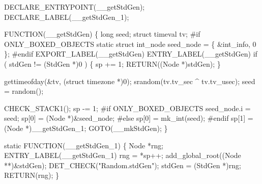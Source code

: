 DECLARE_ENTRYPOINT(__getStdGen);
DECLARE_LABEL(__getStdGen_1);

FUNCTION(__getStdGen)
\{
    long           seed;
    struct timeval tv;
#if ONLY_BOXED_OBJECTS
    static struct int_node seed_node = \{ &int_info, 0 \};
#endif
    EXPORT_LABEL(__getStdGen)
 ENTRY_LABEL(__getStdGen)
    if ( stdGen != (StdGen *)0 )
    \{
        sp += 1;
        RETURN((Node *)stdGen);
    \}

    gettimeofday(&tv, (struct timezone *)0);
    srandom(tv.tv_sec ^ tv.tv_usec);
    seed = random();

    CHECK_STACK1();
    sp -= 1;
#if ONLY_BOXED_OBJECTS
    seed_node.i = seed;
    sp[0]       = (Node *)&seed_node;
#else
    sp[0] = mk_int(seed);
#endif
    sp[1] = (Node *)__getStdGen_1;
    GOTO(__mkStdGen);
\}

static
FUNCTION(__getStdGen_1)
\{
    Node *rng;
 ENTRY_LABEL(__getStdGen_1)
    rng = *sp++;
    add_global_root((Node **)&stdGen);
    DET_CHECK("Random.stdGen");
    stdGen = (StdGen *)rng;
    RETURN(rng);
\}
\nwendcode{}

%

